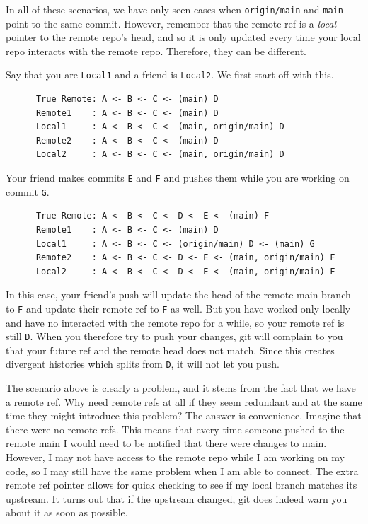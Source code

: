   In all of these scenarios, we have only seen cases when \texttt{origin/main} and \texttt{main} point to the same commit. However, remember that the remote ref is a \textit{local} pointer to the remote repo's head, and so it is only updated every time your local repo interacts with the remote repo. Therefore, they can be different. 

  \begin{example}
    \label{ex:remote-ref-is-different-from-true-remote-head}
    Say that you are \texttt{Local1} and a friend is \texttt{Local2}. We first start off with this. 
    \begin{lstlisting}
      True Remote: A <- B <- C <- (main) D
      Remote1    : A <- B <- C <- (main) D 
      Local1     : A <- B <- C <- (main, origin/main) D 
      Remote2    : A <- B <- C <- (main) D
      Local2     : A <- B <- C <- (main, origin/main) D
    \end{lstlisting}
    Your friend makes commits \texttt{E} and \texttt{F} and pushes them while you are working on commit \texttt{G}.  
    \begin{lstlisting}
      True Remote: A <- B <- C <- D <- E <- (main) F
      Remote1    : A <- B <- C <- (main) D 
      Local1     : A <- B <- C <- (origin/main) D <- (main) G
      Remote2    : A <- B <- C <- D <- E <- (main, origin/main) F 
      Local2     : A <- B <- C <- D <- E <- (main, origin/main) F 
    \end{lstlisting} 
    In this case, your friend's push will update the head of the remote main branch to \texttt{F} and update their remote ref to \texttt{F} as well. But you have worked only locally and have no interacted with the remote repo for a while, so your remote ref is still \texttt{D}. When you therefore try to push your changes, git will complain to you that your future ref and the remote head does not match. Since this creates divergent histories which splits from \texttt{D}, it will not let you push. 
  \end{example}

  The scenario above is clearly a problem, and it stems from the fact that we have a remote ref. Why need remote refs at all if they seem redundant and at the same time they might introduce this problem? The answer is convenience. Imagine that there were no remote refs. This means that every time someone pushed to the remote main I would need to be notified that there were changes to main. However, I may not have access to the remote repo while I am working on my code, so I may still have the same problem when I am able to connect. The extra remote ref pointer allows for quick checking to see if my local branch matches its upstream. It turns out that if the upstream changed, git does indeed warn you about it as soon as possible. 

